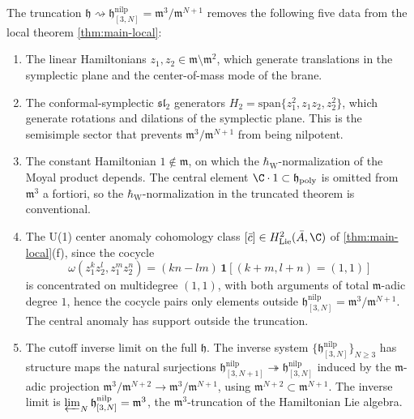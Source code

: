 \begin{prop}\label{prop:trunc-lost-sectors}
The truncation $\mathfrak h\rightsquigarrow\mathfrak h^{\mathrm{nilp}}_{[3,N]}=
\mathfrak m^3/\mathfrak m^{N+1}$ removes the following five
data from the local theorem \ref{thm:main-local}:
\begin{enumerate}
  \item\label{lost:translations}
    The linear Hamiltonians $z_1,z_2\in\mathfrak m\setminus\mathfrak m^2$,
    which generate translations in the symplectic plane and the
    center-of-mass mode of the brane.
  \item\label{lost:sl2}
    The conformal-symplectic $\mathfrak{sl}_2$ generators
    $H_2=\mathrm{span}\{z_1^2,z_1z_2,z_2^2\}$, which generate
    rotations and dilations of the symplectic plane. This is the
    semisimple sector that prevents $\mathfrak m^3/\mathfrak m^{N+1}$
    from being nilpotent.
  \item\label{lost:constants}
    The constant Hamiltonian $1\notin\mathfrak m$, on which the
    \(\hbar_{\mathrm{W}}\)-normalization of the Moyal product depends. The
    central element $\C\cdot 1\subset\mathfrak h_{\mathrm{poly}}$
    is omitted from $\mathfrak m^3$ a fortiori, so the
    \(\hbar_{\mathrm{W}}\)-normalization in the truncated theorem is conventional.
  \item\label{lost:u1-anomaly}
    The U(1) center anomaly cohomology class
    $[\bar c]\in H^2_{\mathrm{Lie}}(\bar A,\C)$ of
    \ref{thm:main-local}(f), since the cocycle
    $$\omega(z_1^kz_2^l,z_1^mz_2^n)=(kn-lm)\,
       \mathbf 1[(k+m,l+n)=(1,1)]$$
    is concentrated on multidegree $(1,1)$, with both arguments of
    total $\mathfrak m$-adic degree $1$, hence the cocycle pairs
    only elements outside $\mathfrak h^{\mathrm{nilp}}_{[3,N]}=\mathfrak m^3/
    \mathfrak m^{N+1}$. The central anomaly has support outside the
    truncation.
  \item\label{lost:colim}
    The cutoff inverse limit on the full
    $\mathfrak h$. The inverse system
    $\{\mathfrak h^{\mathrm{nilp}}_{[3,N]}\}_{N\geq 3}$ has structure maps the
    natural surjections
    $\mathfrak h^{\mathrm{nilp}}_{[3,N+1]}\twoheadrightarrow\mathfrak h^{\mathrm{nilp}}_{[3,N]}$
    induced by the $\mathfrak m$-adic projection
    \(\mathfrak m^3/\mathfrak m^{N+2}\to
    \mathfrak m^3/\mathfrak m^{N+1}\), using
    \(\mathfrak m^{N+2}\subset\mathfrak m^{N+1}\). The inverse limit
    is $\varprojlim_N\mathfrak h^{\mathrm{nilp}}_{[3,N]}=\mathfrak m^3$, the
    $\mathfrak m^3$-truncation of the Hamiltonian Lie algebra.

\end{enumerate}
\end{prop}
